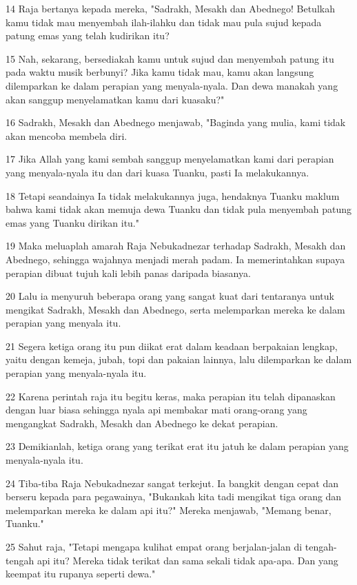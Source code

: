 \par 14 Raja bertanya kepada mereka, "Sadrakh, Mesakh dan Abednego! Betulkah kamu tidak mau menyembah ilah-ilahku dan tidak mau pula sujud kepada patung emas yang telah kudirikan itu?
\par 15 Nah, sekarang, bersediakah kamu untuk sujud dan menyembah patung itu pada waktu musik berbunyi? Jika kamu tidak mau, kamu akan langsung dilemparkan ke dalam perapian yang menyala-nyala. Dan dewa manakah yang akan sanggup menyelamatkan kamu dari kuasaku?"
\par 16 Sadrakh, Mesakh dan Abednego menjawab, "Baginda yang mulia, kami tidak akan mencoba membela diri.
\par 17 Jika Allah yang kami sembah sanggup menyelamatkan kami dari perapian yang menyala-nyala itu dan dari kuasa Tuanku, pasti Ia melakukannya.
\par 18 Tetapi seandainya Ia tidak melakukannya juga, hendaknya Tuanku maklum bahwa kami tidak akan memuja dewa Tuanku dan tidak pula menyembah patung emas yang Tuanku dirikan itu."
\par 19 Maka meluaplah amarah Raja Nebukadnezar terhadap Sadrakh, Mesakh dan Abednego, sehingga wajahnya menjadi merah padam. Ia memerintahkan supaya perapian dibuat tujuh kali lebih panas daripada biasanya.
\par 20 Lalu ia menyuruh beberapa orang yang sangat kuat dari tentaranya untuk mengikat Sadrakh, Mesakh dan Abednego, serta melemparkan mereka ke dalam perapian yang menyala itu.
\par 21 Segera ketiga orang itu pun diikat erat dalam keadaan berpakaian lengkap, yaitu dengan kemeja, jubah, topi dan pakaian lainnya, lalu dilemparkan ke dalam perapian yang menyala-nyala itu.
\par 22 Karena perintah raja itu begitu keras, maka perapian itu telah dipanaskan dengan luar biasa sehingga nyala api membakar mati orang-orang yang mengangkat Sadrakh, Mesakh dan Abednego ke dekat perapian.
\par 23 Demikianlah, ketiga orang yang terikat erat itu jatuh ke dalam perapian yang menyala-nyala itu.
\par 24 Tiba-tiba Raja Nebukadnezar sangat terkejut. Ia bangkit dengan cepat dan berseru kepada para pegawainya, "Bukankah kita tadi mengikat tiga orang dan melemparkan mereka ke dalam api itu?" Mereka menjawab, "Memang benar, Tuanku."
\par 25 Sahut raja, "Tetapi mengapa kulihat empat orang berjalan-jalan di tengah-tengah api itu? Mereka tidak terikat dan sama sekali tidak apa-apa. Dan yang keempat itu rupanya seperti dewa."
